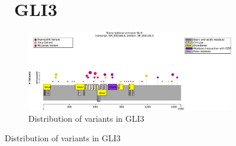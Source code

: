 \begin{figure}[htbp]
\section*{ GLI3}
\centering
\begin{subfigure}[b]{0.95\textwidth}
\centering
\includegraphics[width=\textwidth]{ img/GLI3_protein_diagram.pdf} 
\captionsetup{justification=raggedright,singlelinecheck=false}
\caption{Distribution of variants in GLI3}
\end{subfigure}

\vspace{0.4em}


\end{figure}

